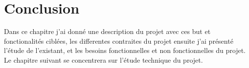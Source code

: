 \section{Conclusion}

Dans ce chapitre j’ai donné une description du projet avec ces but et fonctionalités ciblées, les differentes contraites du projet ensuite j'ai présenté l’étude de l’existant, et les besoins fonctionnelles et non fonctionnelles du projet. 
\\
Le chapitre suivant se concentrera sur l’étude technique du projet.

